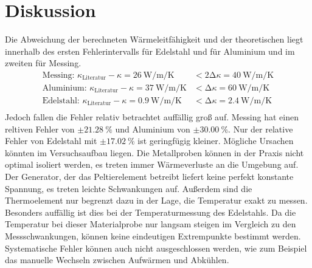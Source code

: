 \section{Diskussion}
\label{sec:Diskussion}

Die Abweichung der berechneten Wärmeleitfähigkeit und der theoretischen liegt innerhalb des ersten Fehlerintervalls für Edelstahl und für Aluminium und im zweiten für Messing.
\begin{align*}
  \text{Messing: }   \kappa_\text{Literatur} - \kappa = \SI{26}{\watt\per\meter\per\kelvin} &< 2\increment \kappa = \SI{40}{\watt\per\meter\per\kelvin} \\
  \text{Aluminium: } \kappa_\text{Literatur} - \kappa = \SI{37}{\watt\per\meter\per\kelvin} &< \increment \kappa = \SI{60}{\watt\per\meter\per\kelvin} \\
  \text{Edelstahl: } \kappa_\text{Literatur} - \kappa = \SI{0.9}{\watt\per\meter\per\kelvin} &< \increment \kappa = \SI{2.4}{\watt\per\meter\per\kelvin} \\
\end{align*}
Jedoch fallen die Fehler relativ betrachtet auffällig groß auf.
Messing hat einen reltiven Fehler von $\pm \SI{21.28}{\percent}$ und Aluminium von $\pm \SI{30.00}{\percent}$.
Nur der relative Fehler von Edelstahl mit $\pm \SI{17.02}{\percent}$ ist geringfügig kleiner.
Mögliche Ursachen könnten im Versuchsaufbau liegen.
Die Metallproben können in der Praxis nicht optimal isoliert werden, es treten immer Wärmeverluste an die Umgebung auf.
Der Generator, der das Peltierelement betreibt liefert keine perfekt konstante Spannung, es treten leichte Schwankungen auf.
Außerdem sind die Thermoelement nur begrenzt dazu in der Lage, die Temperatur exakt zu messen.
Besonders auffällig ist dies bei der Temperaturmessung des Edelstahls.
Da die Temperatur bei dieser Materialprobe nur langsam steigen im Vergleich zu den Messschwankungen, können keine eindeutigen Extrempunkte bestimmt werden.
Systematische Fehler können auch nicht ausgeschlossen werden, wie zum Beispiel das manuelle Wechseln zwischen Aufwärmen und Abkühlen.
